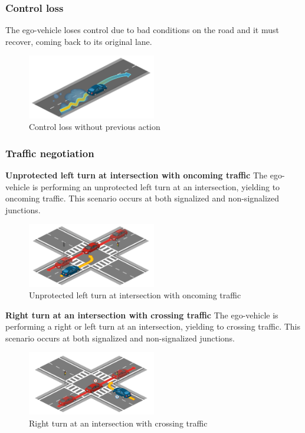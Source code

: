 \documentclass{article}
\begin{document}
\subsubsection{Control loss}
The ego-vehicle loses control due to bad conditions on the road and it must recover, coming back to its original lane.
\begin{figure}[h]
    \centering
    \includegraphics[width=0.5\textwidth]{img/TR01.png}
    \caption{Control loss without previous action} \label{Scenario_controlLoss}
\end{figure}

\subsubsection{Traffic negotiation}
\textbf{Unprotected left turn at intersection with oncoming traffic}
The ego-vehicle is performing an unprotected left turn at an intersection, yielding to oncoming traffic. This scenario occurs at both signalized and non-signalized junctions.
\begin{figure}[h]
    \centering
    \includegraphics[width=0.5\textwidth]{img/TR08.png}
    \caption{Unprotected left turn at intersection with oncoming traffic} \label{leftTurn}
\end{figure}

\textbf{Right turn at an intersection with crossing traffic}
The ego-vehicle is performing a right or left turn at an intersection, yielding to crossing traffic. This scenario occurs at both signalized and non-signalized junctions.
\begin{figure}[h]
    \centering
    \includegraphics[width=0.5\textwidth]{img/TR09.png}
    \caption{Right turn at an intersection with crossing traffic} \label{rightTurn}
\end{figure}
\end{document}
